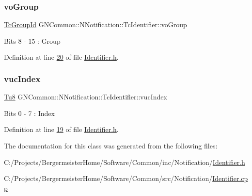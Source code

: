 \mbox{\label{class_g_n_common_1_1_n_notification_1_1_tc_identifier_afcf493852b92439dca37c671b549c2d3}} 
\subsubsection{\texorpdfstring{vo\+Group}{voGroup}}
{\footnotesize\ttfamily \mbox{\hyperlink{namespace_g_n_common_1_1_n_notification_af29017ad6ed59156beabc385a91db18e}{Tc\+Group\+Id}} G\+N\+Common\+::\+N\+Notification\+::\+Tc\+Identifier\+::vo\+Group}

Bits 8 -\/ 15 \+: Group 

Definition at line \mbox{\hyperlink{_identifier_8h_source_l00020}{20}} of file \mbox{\hyperlink{_identifier_8h_source}{Identifier.\+h}}.

\mbox{\label{class_g_n_common_1_1_n_notification_1_1_tc_identifier_a704ac106036ca2d6b4fae77be75e7913}} 
\subsubsection{\texorpdfstring{vuc\+Index}{vucIndex}}
{\footnotesize\ttfamily \mbox{\hyperlink{namespace_g_n_common_a7939e251ddbf5d3a31832dcfdc8bde39}{Tu8}} G\+N\+Common\+::\+N\+Notification\+::\+Tc\+Identifier\+::vuc\+Index}

Bits 0 -\/ 7 \+: Index 

Definition at line \mbox{\hyperlink{_identifier_8h_source_l00019}{19}} of file \mbox{\hyperlink{_identifier_8h_source}{Identifier.\+h}}.



The documentation for this class was generated from the following files\+:\begin{DoxyCompactItemize}
\item 
C\+:/\+Projects/\+Bergermeister\+Home/\+Software/\+Common/inc/\+Notification/\mbox{\hyperlink{_identifier_8h}{Identifier.\+h}}\item 
C\+:/\+Projects/\+Bergermeister\+Home/\+Software/\+Common/src/\+Notification/\mbox{\hyperlink{_identifier_8cpp}{Identifier.\+cpp}}\end{DoxyCompactItemize}
